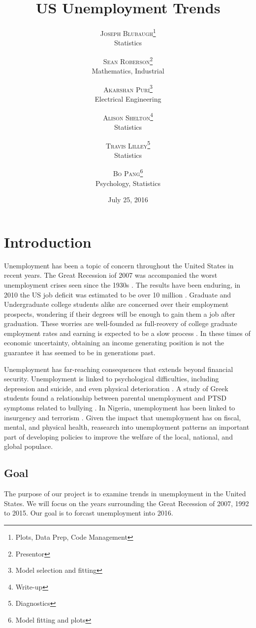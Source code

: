 \documentclass[twoside,twocolumn]{article}
\title{US Unemployment Trends} %
\author{%
\textsc{Joseph Blubaugh}\thanks{Plots, Data Prep, Code Management} \\[1ex] %
\normalsize Statistics\\ %
\and %
\textsc{Sean Roberson}\thanks{Presentor} \\[1ex] %
\normalsize Mathematics, Industrial\\ %
\and 
\textsc{Akarshan Puri}\thanks{Model selection and fitting} \\[1ex] 
\normalsize Electrical Engineering\\ 
\and 
\textsc{Alison Shelton}\thanks{Write-up} \\[1ex] 
\normalsize Statistics\\ 
\and 
\textsc{Travis Lilley}\thanks{Diagnostics} \\[1ex] 
\normalsize Statistics\\ 
\and
\textsc{Bo Pang}\thanks{Model fitting and plots} \\[1 ex]
\normalsize Psychology, Statistics
\vspace*{.5 cm}
}
\date{July 25, 2016 \vspace*{.25 cm}} %
\begin{document}
\maketitle


\section{Introduction}
		Unemployment has been a topic of concern throughout the United States in recent years.  The Great Recession iof 2007 was accompanied the worst unemployment crises seen since the 1930s \citep{wanberg2012individual}.   The results have been enduring, in 2010 the US job deficit was estimated to be over 10 million \citep{katz2010}. Graduate and Undergraduate college students alike are concerned over their employment prospects, wondering if their degrees will be enough to gain them a job after graduation.  These worries are well-founded as full-reovery of college graduate employment rates and earning is expected to be a slow process \cite{carnevale2015hard}.  In these times of economic uncertainty, obtaining an income generating position is not the guarantee it has seemed to be in generations past.
		
Unemployment has far-reaching consequences that extends beyond financial security. Unemployment is linked to psychological difficulties, including depression and suicide, and even physical deterioration \citep{wanberg2012individual, insecure, suicide}. A study of Greek students found a relationship between parental unemployment and PTSD symptoms related to bullying \citep{kanellopoulos2014epa}. In Nigeria, unemployment has been linked to insurgency and terrorism \citep{terrorism}. Given the impact that unemployment has on fiscal, mental, and physical health, reasearch into unemployment patterns an important part of developing policies to improve the welfare of the local, national, and global populace.

\subsection{Goal}
		The purpose of our project is to examine trends in unemployment in the United States. We will focus on the years surrounding the Great Recession of 2007, 1992 to 2015.  Our goal is to forcast unemployment into 2016. 
\end{document}
